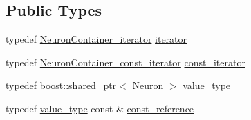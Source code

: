 \subsection*{Public Types}
\begin{DoxyCompactItemize}
\item 
typedef \hyperlink{_a_m_o_r_e_8h_a36be90b8d9f454d85104cd4a44467e00}{NeuronContainer\_\-iterator} \hyperlink{class_neuron_container_abf81356adaea3bfc64aa03777e9a8def}{iterator}
\item 
typedef \hyperlink{_a_m_o_r_e_8h_af3f69a84a2f298d29ab490ec36f6d247}{NeuronContainer\_\-const\_\-iterator} \hyperlink{class_neuron_container_a41749602f05e7610da7f0f1fd59f5442}{const\_\-iterator}
\item 
typedef boost::shared\_\-ptr$<$ \hyperlink{class_neuron}{Neuron} $>$ \hyperlink{class_neuron_container_ac067345f1d27a5b04e4d9487b319ccaa}{value\_\-type}
\item 
typedef \hyperlink{class_neuron_container_ac067345f1d27a5b04e4d9487b319ccaa}{value\_\-type} const \& \hyperlink{class_neuron_container_a468ffbb00b15553f73da46dd62c91c8d}{const\_\-reference}
\end{DoxyCompactItemize}
